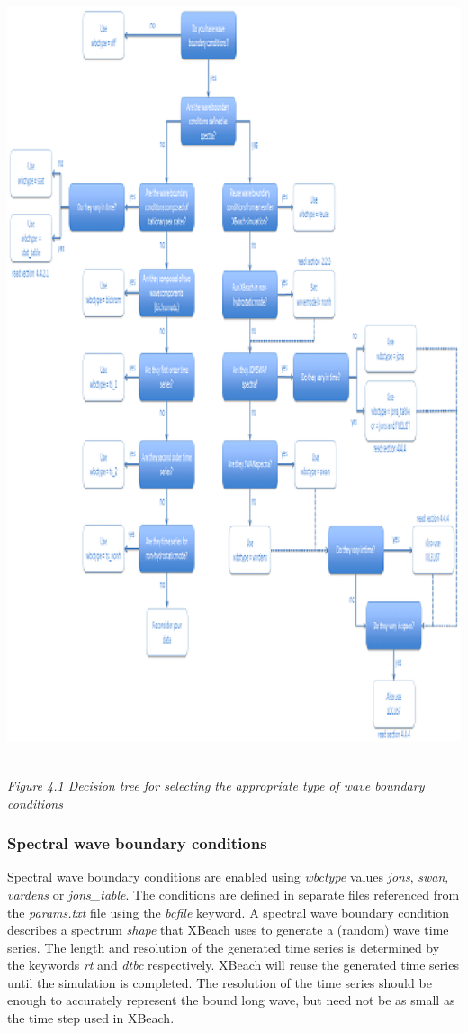\documentclass{article}
\begin{document}
\noindent \includegraphics*[width=5.40in, height=8.92in, keepaspectratio=false]{image24}

\noindent \textit{Figure 4.1 Decision tree for selecting the appropriate type of wave boundary conditions}


\subsubsection{ Spectral wave boundary conditions}

\noindent Spectral wave boundary conditions are enabled using \textit{wbctype} values \textit{jons}, \textit{swan}, \textit{vardens} or \textit{jons\_table}. The conditions are defined in separate files referenced from the \textit{params.txt} file using the \textit{bcfile} keyword. A spectral wave boundary condition describes a spectrum \textit{shape} that XBeach uses to generate a (random) wave time series. The length and resolution of the generated time series is determined by the keywords \textit{rt} and \textit{dtbc} respectively. XBeach will reuse the generated time series until the simulation is completed. The resolution of the time series should be enough to accurately represent the bound long wave, but need not be as small as the time step used in XBeach.
\end{document}
